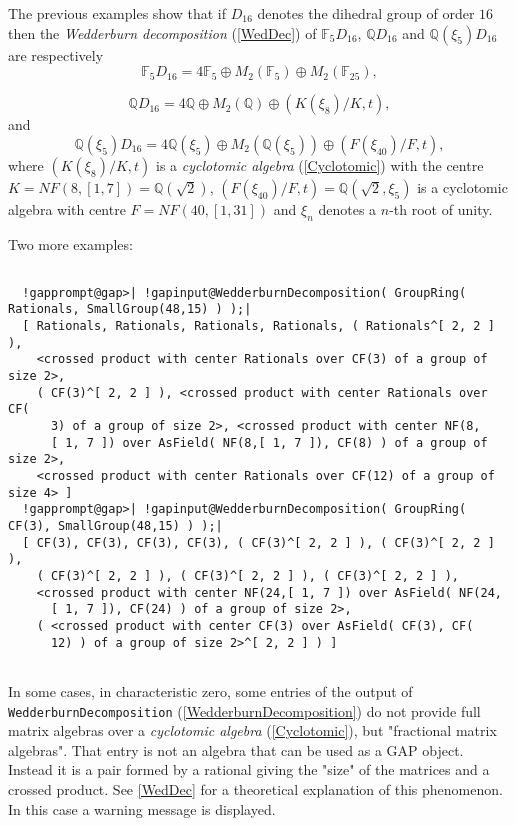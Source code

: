 \documentclass[a4paper,11pt]{report}
\begin{document}
{{{\begin{Verbatim}[commandchars=!@|,fontsize=\small,frame=single,label=Example]
\end{Verbatim}
 }

 The previous examples show that if $D_{16}$ denotes the dihedral group of order $16$ then the \emph{Wedderburn decomposition} (\ref{WedDec}) of $\mathbb F_5 D_{16}$, ${\ensuremath{\mathbb Q}} D_{16}$ and ${\ensuremath{\mathbb Q}} (\xi_5) D_{16}$ are respectively 
\[ \mathbb F_5 D_{16} = 4 \mathbb F_5 \oplus M_2( \mathbb F_5 ) \oplus M_2(
\mathbb F_{25} ), \]
 
\[ {\ensuremath{\mathbb Q}} D_{16} = 4 {\ensuremath{\mathbb Q}} \oplus M_2(
{\ensuremath{\mathbb Q}} ) \oplus (K(\xi_8)/K,t), \]
 and 
\[ {\ensuremath{\mathbb Q}} (\xi_5) D_{16} = 4 {\ensuremath{\mathbb Q}} (\xi_5)
\oplus M_2( {\ensuremath{\mathbb Q}} (\xi_5) ) \oplus (F(\xi_{40})/F,t), \]
 where $(K(\xi_8)/K,t)$ is a \emph{cyclotomic algebra} (\ref{Cyclotomic}) with the centre $K=NF(8,[ 1, 7 ])= {\ensuremath{\mathbb Q}} (\sqrt{2})$, $(F(\xi_{40})/F,t) = {\ensuremath{\mathbb Q}} (\sqrt{2},\xi_5)$ is a cyclotomic algebra with centre $F=NF(40,[ 1, 31 ])$ and $\xi_n$ denotes a $n$-th root of unity. 

 Two more examples: 
\begin{Verbatim}[commandchars=!@|,fontsize=\small,frame=single,label=Example]
  
  !gapprompt@gap>| !gapinput@WedderburnDecomposition( GroupRing( Rationals, SmallGroup(48,15) ) );|
  [ Rationals, Rationals, Rationals, Rationals, ( Rationals^[ 2, 2 ] ),
    <crossed product with center Rationals over CF(3) of a group of size 2>,
    ( CF(3)^[ 2, 2 ] ), <crossed product with center Rationals over CF(
      3) of a group of size 2>, <crossed product with center NF(8,
      [ 1, 7 ]) over AsField( NF(8,[ 1, 7 ]), CF(8) ) of a group of size 2>,
    <crossed product with center Rationals over CF(12) of a group of size 4> ]
  !gapprompt@gap>| !gapinput@WedderburnDecomposition( GroupRing( CF(3), SmallGroup(48,15) ) );|
  [ CF(3), CF(3), CF(3), CF(3), ( CF(3)^[ 2, 2 ] ), ( CF(3)^[ 2, 2 ] ),
    ( CF(3)^[ 2, 2 ] ), ( CF(3)^[ 2, 2 ] ), ( CF(3)^[ 2, 2 ] ),
    <crossed product with center NF(24,[ 1, 7 ]) over AsField( NF(24,
      [ 1, 7 ]), CF(24) ) of a group of size 2>,
    ( <crossed product with center CF(3) over AsField( CF(3), CF(
      12) ) of a group of size 2>^[ 2, 2 ] ) ]
  
\end{Verbatim}
 In some cases, in characteristic zero, some entries of the output of \texttt{WedderburnDecomposition} (\ref{WedderburnDecomposition}) do not provide full matrix algebras over a \emph{cyclotomic algebra} (\ref{Cyclotomic}), but "fractional matrix algebras". That entry is not an algebra that can be
used as a \textsf{GAP} object. Instead it is a pair formed by a rational giving the "size" of the
matrices and a crossed product. See \ref{WedDec} for a theoretical explanation of this phenomenon. In this case a warning
message is displayed. 
\begin{Verbatim}[commandchars=@|H,fontsize=\small,frame=single,label=Example]
  

\end{Verbatim}}}
\end{document}

